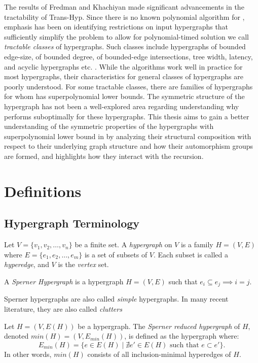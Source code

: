 The results of Fredman and Khachiyan made significant advancements in the tractability of Trans-Hyp. Since there is no known polynomial algorithm for \TransHyp, emphasis has been on identifying restrictions on input hypergraphs that sufficiently simplify the problem to allow for polynomial-timed solution we call \emph{tractable classes} of hypergraphs. Such classes include hypergraphs of bounded edge-size, of bounded degree, of bounded-edge intersections, tree width, latency, and acyclic hypergraphs etc. \cite{EMG08}. While the algorithms work well in practice for most hypergraphs, their characteristics for general classes of hypergraphs are poorly understood. For some tractable classes, there are families of hypergraphs for whom \FKA{} has superpolynomial lower bounds. The symmetric structure of the hypergraph has not been a well-explored area regarding understanding why \FKA{} performs suboptimally for these hypergraphs. This thesis aims to gain a better understanding of the symmetric properties of the hypergraphs with superpolynomial lower bound in \FKA{} by analyzing their structural composition with respect to their underlying graph structure and how their automorphism groups are formed, and highlights how they interact with the \FKA{} recursion.

\section{Definitions}

\subsection{Hypergraph Terminology}

\begin{definition}
Let $V=\{v_1,v_2,\dots,v_n\}$ be a finite set. A \emph{hypergraph} on $V$ is a family $H=(V,E)$ where $E=\{e_1,e_2,\dots,e_m\}$ is a set of subsets of $V$. Each subset is called a \emph{hyperedge}, and $V$ is the \emph{vertex} set.
\end{definition}

\begin{definition}
A \emph{Sperner Hypergraph} is a hypergraph $H=(V,E)$ such that $e_i\subseteq e_j\implies i=j$.
\end{definition}

Sperner hypergraphs are also called \emph{simple} hypergraphs. In many recent literature, they are also called \emph{clutters}

\begin{definition}\label{def:sperner-reduction}
Let $H=(V,E(H))$ be a hypergraph. The \emph{Sperner reduced hypergraph} of $H$, denoted $min(H)=(V,E_{min}(H))$, is defined as the hypergraph where:
\[
E_{min}(H)=\{e\in E(H)\mid \nexists e'\in E(H)\text{ such that }e\subset e'\}.
\]
In other words, $min(H)$ consists of all inclusion-minimal hyperedges of $H$.
\end{definition}

